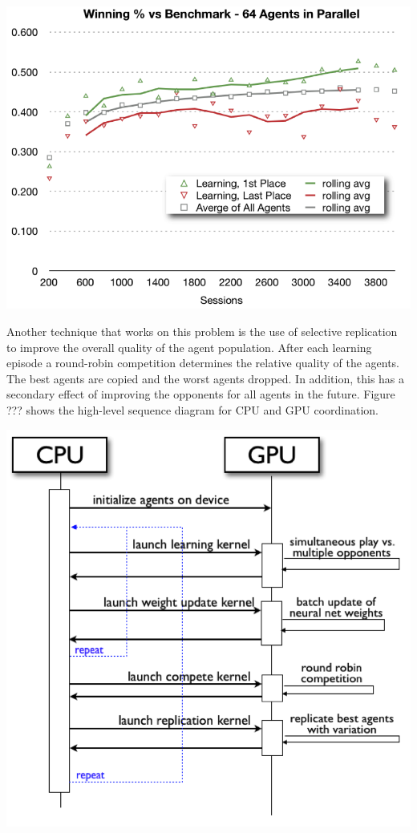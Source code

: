\center
\includegraphics[scale=0.8]{fig18}
\begin{flushleft}


Another technique that works on this problem is the use of selective replication to improve the overall quality of the agent population.  After each learning episode a round-robin competition determines the relative quality of the agents.  The best agents are copied and the worst agents dropped.  In addition, this has a secondary effect of improving the opponents for all agents in the future.  Figure ??? shows the high-level sequence diagram for CPU and GPU coordination.

\end{flushleft}
\center
\includegraphics[scale=0.8]{fig19}

